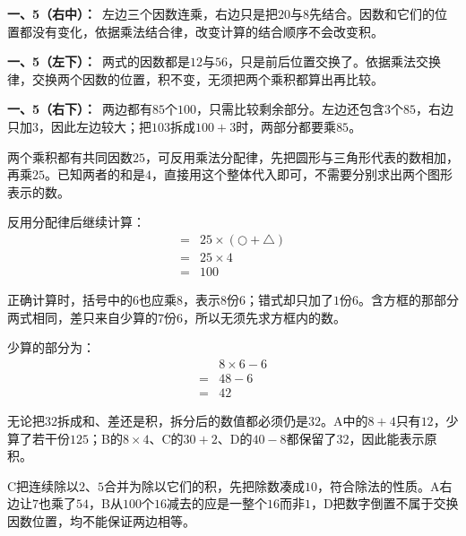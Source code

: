 \documentclass[multi=snippet,border=0pt]{standalone}
\newenvironment{snippet}[3]{\begin{minipage}{#1bp}\color{answerred}\fontsize{#2}{#3}\selectfont\raggedright}{\end{minipage}}
\begin{document}
\begin{snippet}{505}{11.5}{14}\textbf{一、5（右中）：}\ 左边三个因数连乘，右边只是把\(20\)与\(8\)先结合。因数和它们的位置都没有变化，依据乘法结合律，改变计算的结合顺序不会改变积。\end{snippet}
\begin{snippet}{505}{11.5}{14}\textbf{一、5（左下）：}\ 两式的因数都是\(12\)与\(56\)，只是前后位置交换了。依据乘法交换律，交换两个因数的位置，积不变，无须把两个乘积都算出再比较。\end{snippet}
\begin{snippet}{505}{11.5}{14}\textbf{一、5（右下）：}\ 两边都有\(85\)个\(100\)，只需比较剩余部分。左边还包含\(3\)个\(85\)，右边只加\(3\)，因此左边较大；把\(103\)拆成\(100+3\)时，两部分都要乘\(85\)。\end{snippet}
\begin{snippet}{505}{11.5}{14}两个乘积都有共同因数\(25\)，可反用乘法分配律，先把圆形与三角形代表的数相加，再乘\(25\)。已知两者的和是\(4\)，直接用这个整体代入即可，不需要分别求出两个图形表示的数。\par 反用分配律后继续计算：\[\begin{aligned}={}&25\times(\bigcirc+\triangle)\\={}&25\times4\\={}&100\end{aligned}\]\end{snippet}
\begin{snippet}{505}{11.5}{14}正确计算时，括号中的\(6\)也应乘\(8\)，表示\(8\)份\(6\)；错式却只加了\(1\)份\(6\)。含方框的那部分两式相同，差只来自少算的\(7\)份\(6\)，所以无须先求方框内的数。\par 少算的部分为：\[\begin{aligned}&8\times6-6\\={}&48-6\\={}&42\end{aligned}\]\end{snippet}
\begin{snippet}{505}{11.5}{14}无论把\(32\)拆成和、差还是积，拆分后的数值都必须仍是\(32\)。A中的\(8+4\)只有\(12\)，少算了若干份\(125\)；B的\(8\times4\)、C的\(30+2\)、D的\(40-8\)都保留了\(32\)，因此能表示原积。\end{snippet}
\begin{snippet}{505}{11.5}{14}C把连续除以\(2\)、\(5\)合并为除以它们的积，先把除数凑成\(10\)，符合除法的性质。A右边让\(7\)也乘了\(54\)，B从\(100\)个\(16\)减去的应是一整个\(16\)而非\(1\)，D把数字倒置不属于交换因数位置，均不能保证两边相等。\end{snippet}
\end{document}
